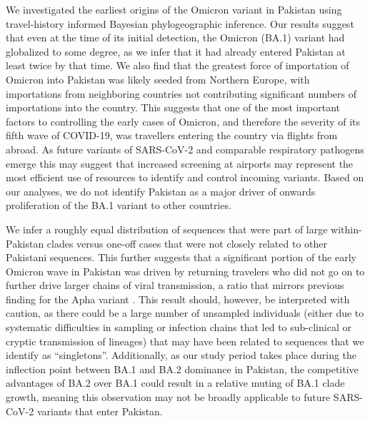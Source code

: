 We investigated the earliest origins of the Omicron variant in Pakistan using travel-history informed Bayesian phylogeographic inference.
Our results suggest that even at the time of its initial detection, the Omicron (BA.1) variant had globalized to some degree, as we infer that it had already entered Pakistan at least twice by that time.
We also find that the greatest force of importation of Omicron into Pakistan was likely seeded from Northern Europe, with importations from neighboring countries not contributing significant numbers of importations into the country.
This suggests that one of the most important factors to controlling the early cases of Omicron, and therefore the severity of its fifth wave of COVID-19, was travellers entering the country via flights from abroad.
As future variants of SARS-CoV-2 and comparable respiratory pathogens emerge this may suggest that increased screening at airports may represent the most efficient use of resources to identify and control incoming variants.
Based on our analyses, we do not identify Pakistan as a major driver of onwards proliferation of the BA.1 variant to other countries.

We infer a roughly equal distribution of sequences that were part of large within-Pakistan clades versus one-off cases that were not closely related to other Pakistani sequences.
This further suggests that a significant portion of the early Omicron wave in Pakistan was driven by returning travelers who did not go on to further drive larger chains of viral transmission, a ratio that mirrors previous finding for the Apha variant \citep{nasir2022evolutionary}.
This result should, however, be interpreted with caution, as there could be a large number of unsampled individuals (either due to systematic difficulties in sampling or infection chains that led to sub-clinical or cryptic transmission of lineages) that may have been related to sequences that we identify as ``singletons''. 
Additionally, as our study period takes place during the inflection point between BA.1 and BA.2 dominance in Pakistan, the competitive advantages of BA.2 over BA.1 could result in a relative muting of BA.1 clade growth, meaning this observation may not be broadly applicable to future SARS-CoV-2 variants that enter Pakistan.

